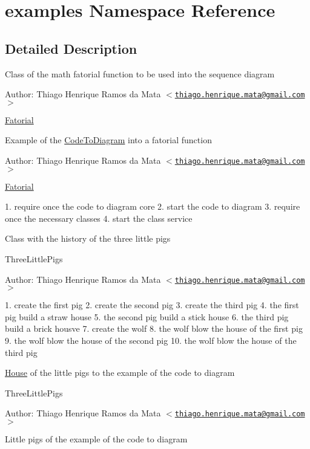 \hypertarget{namespaceexamples}{
\section{examples Namespace Reference}
\label{namespaceexamples}
}


\subsection{Detailed Description}
Class of the math fatorial function to be used into the sequence diagram

\begin{Desc}
\item[Author:]Thiago Henrique Ramos da Mata $<$\href{mailto:thiago.henrique.mata@gmail.com}{\tt thiago.henrique.mata@gmail.com}$>$\end{Desc}
\hyperlink{class_fatorial}{Fatorial}

Example of the \hyperlink{namespace_code_to_diagram}{CodeToDiagram} into a fatorial function

\begin{Desc}
\item[Author:]Thiago Henrique Ramos da Mata $<$\href{mailto:thiago.henrique.mata@gmail.com}{\tt thiago.henrique.mata@gmail.com}$>$\end{Desc}
\hyperlink{class_fatorial}{Fatorial}

1. require once the code to diagram core 2. start the code to diagram 3. require once the necessary classes 4. start the class service

Class with the history of the three little pigs

ThreeLittlePigs \begin{Desc}
\item[Author:]Thiago Henrique Ramos da Mata $<$\href{mailto:thiago.henrique.mata@gmail.com}{\tt thiago.henrique.mata@gmail.com}$>$\end{Desc}
1. create the first pig 2. create the second pig 3. create the third pig 4. the first pig build a straw house 5. the second pig build a stick house 6. the third pig build a brick housve 7. create the wolf 8. the wolf blow the house of the first pig 9. the wolf blow the house of the second pig 10. the wolf blow the house of the third pig

\hyperlink{class_house}{House} of the little pigs to the example of the code to diagram

ThreeLittlePigs \begin{Desc}
\item[Author:]Thiago Henrique Ramos da Mata $<$\href{mailto:thiago.henrique.mata@gmail.com}{\tt thiago.henrique.mata@gmail.com}$>$\end{Desc}
Little pigs of the example of the code to diagram

